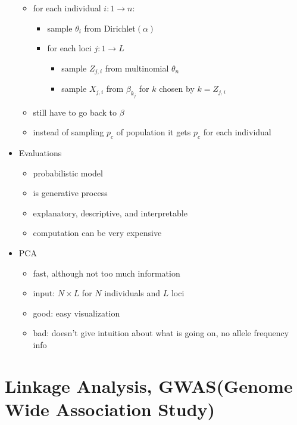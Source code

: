\documentclass[font=12pt]{article}
\begin{document}
\begin{itemize}
\begin{itemize}
\begin{figure}[h!]
		\end{figure}
		\item for each individual $i: 1\rightarrow n $:
		\begin{itemize}
			\item sample $ \theta_i $ from Dirichlet$ (\alpha) $
			\item for each loci $j: 1 \rightarrow L$
			\begin{itemize}
				\item sample $ Z_{j,i} $ from multinomial $ \theta_n $
				\item sample $ X_{j,i} $ from $ \beta_{k_j} $ for $ k $ chosen by $ k= Z_{j,i} $
			\end{itemize}
		\end{itemize}
	\item still have to go back to $ \beta $
	\item instead of sampling $ p_c $ of population it gets $ p_c $ for each individual
	\end{itemize}
	\item Evaluations
	\begin{itemize}
		\item probabilistic model
		\item is generative process
		\item explanatory, descriptive, and interpretable
		\item computation can be very expensive
	\end{itemize}
	\item PCA
	\begin{itemize}
		\item fast, although not too much information
		\item input: $ N\times L $ for $ N $ individuals and $ L $ loci
		\item good: easy visualization
		\item bad: doesn't give intuition about what is going on, no allele frequency info
	\end{itemize}
\end{itemize}
\newpage
\section{Linkage Analysis, GWAS(Genome Wide Association Study)}
\end{document}
